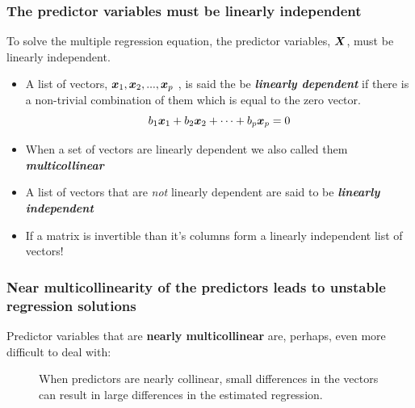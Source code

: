 \documentclass{beamer}
\begin{document}
\begin{frame}
  \frametitle{The predictor variables must be linearly independent}

To solve the multiple regression equation, the predictor variables, $\bm{X}$, must be linearly independent.

\begin{itemize}

\item A list of vectors, $\bm{x}_1, \bm{x}_2, ..., \bm{x}_p$ , is said the be \emph{\textbf{linearly dependent}} if there is a non-trivial combination of them which is equal to the zero vector.
\[
 b_1 \bm{x}_1 + b_2 \bm{x}_2 + \cdots + b_p \bm{x}_p = 0
\]

\item When a set of vectors are linearly dependent we also called them  \emph{\textbf{multicollinear}}

\item A list of vectors that are \emph{not} linearly dependent are said to be \emph{\textbf{linearly independent}}

\item  If a matrix is invertible than it's columns form a linearly independent list of vectors!

\end{itemize}


\end{frame}




\begin{frame}
  \frametitle{Near multicollinearity of the predictors leads to unstable regression solutions}

Predictor variables that are \textbf{nearly multicollinear} are, perhaps, even more difficult to deal with:  

\begin{figure}
\begin{center}
\end{center}
\caption{When predictors are nearly collinear, small differences in the vectors can result in large differences in the estimated regression.}
\end{figure}

\end{frame}
\end{document}
